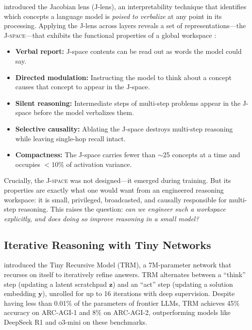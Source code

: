 \documentclass[11pt,a4paper]{article}
\newcommand{\jspace}{\textsc{J-space}}
\begin{document}
\citet{anthropic2026jspace} introduced the Jacobian lens (J-lens), an interpretability technique that identifies which concepts a language model is \emph{poised to verbalize} at any point in its processing. Applying the J-lens across layers reveals a set of representations---the \jspace{}---that exhibits the functional properties of a global workspace \citep{dehaene2014conscious,baars2005global}:

\begin{itemize}[nosep]
    \item \textbf{Verbal report:} J-space contents can be read out as words the model could say.
    \item \textbf{Directed modulation:} Instructing the model to think about a concept causes that concept to appear in the J-space.
    \item \textbf{Silent reasoning:} Intermediate steps of multi-step problems appear in the J-space before the model verbalizes them.
    \item \textbf{Selective causality:} Ablating the J-space destroys multi-step reasoning while leaving single-hop recall intact.
    \item \textbf{Compactness:} The J-space carries fewer than $\sim$25 concepts at a time and occupies $<$10\% of activation variance.
\end{itemize}

Crucially, the \jspace{} was not designed---it emerged during training. But its properties are exactly what one would want from an engineered reasoning workspace: it is small, privileged, broadcasted, and causally responsible for multi-step reasoning. This raises the question: \emph{can we engineer such a workspace explicitly, and does doing so improve reasoning in a small model?}

\subsection{Iterative Reasoning with Tiny Networks}

\citet{jolicoeur2025trm} introduced the Tiny Recursive Model (TRM), a 7M-parameter network that recurses on itself to iteratively refine answers. TRM alternates between a ``think'' step (updating a latent scratchpad $\mathbf{z}$) and an ``act'' step (updating a solution embedding $\mathbf{y}$), unrolled for up to 16 iterations with deep supervision. Despite having less than 0.01\% of the parameters of frontier LLMs, TRM achieves 45\% accuracy on ARC-AGI-1 and 8\% on ARC-AGI-2, outperforming models like DeepSeek R1 and o3-mini on these benchmarks.
\end{document}
